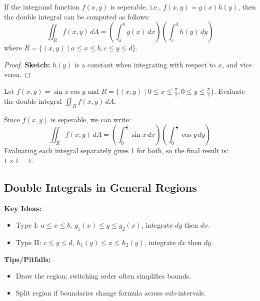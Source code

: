 \documentclass[11pt]{report}
\begin{document}
\begin{theorem}
    If the integrand function $f(x,y)$ is seperable, i.e., $f(x,y) = g(x)h(y)$, then the double integral can be computed as follows:
    \begin{equation}
        \iint_R f(x,y) \, dA = \left( \int_a^b g(x) \, dx \right) \left( \int_c^d h(y) \, dy \right)
    \end{equation}
    where $R = \{ (x,y) \mid a \le x \le b, c \le y \le d \}$.
\end{theorem}
\begin{proof}
    \textbf{Sketch:} $h(y)$ is a constant when integrating with respect to $x$, and vice versa.
\end{proof}

\begin{example}
    Let $f(x,y) = \sin{x} \cos{y}$ and $R = \{ (x,y) \mid 0 \le x \le \frac{\pi}{2}, 0 \le y \le \frac{\pi}{2} \}$. Evaluate the double integral $\iint_R f(x,y) \, dA$.

    Since $f(x,y)$ is seperable, we can write:
    $$
        \iint_R f(x,y) \, dA = \left( \int_0^{\frac{\pi}{2}} \sin{x} \, dx \right) \left( \int_0^{\frac{\pi}{2}} \cos{y} \, dy \right)
    $$
    Evaluating each integral separately gives 1 for both, so the final result is: $1 \times 1 = 1$.
\end{example}
\subsection{Double Integrals in General Regions}

\begin{keybox}
	\textbf{Key Ideas:}
\begin{itemize}
    \item Type I: $a\le x\le b$, $g_1(x)\le y\le g_2(x)$, integrate $dy$ then $dx$.
    \item Type II: $c\le y\le d$, $h_1(y)\le x\le h_2(y)$, integrate $dx$ then $dy$.
\end{itemize}
	\textbf{Tips/Pitfalls:}
\begin{itemize}
    \item Draw the region; switching order often simplifies bounds.
    \item Split region if boundaries change formula across sub-intervals.
\end{itemize}
\end{keybox}
\end{document}
